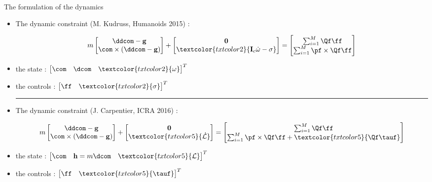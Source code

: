 \begin{frame}{The formulation of the dynamics}

\begin{itemize}

\item The dynamic constraint \textcolor{txtcolor2}{(M. Kudruss, Humanoids 2015)} :
\begin{scriptsize}
\begin{align*}
  m
  \begin{bmatrix}
  \ddcom - {\bf g} \\
  \com \times (\ddcom - {\bf g})
  \end{bmatrix}
  +
  \begin{bmatrix}
   {\bf 0} \\
     \textcolor{txtcolor2}{{\bf I}_c \dot{\omega} - \sigma}
  \end{bmatrix}
  =
  \begin{bmatrix}
  \sum_{i=1}^{M}
  \Qf \ff \\
  \sum_{i=1}^{M}
  \pf \times \Qf  \ff
  \end{bmatrix}
\end{align*}
\end{scriptsize}
\item the state :
$
\begin{bmatrix}
\com & \dcom & \textcolor{txtcolor2}{\omega}
\end{bmatrix}^T
$
\item the controls :
$
\begin{bmatrix}
\ff & \textcolor{txtcolor2}{\sigma}
\end{bmatrix}^T
$

\textcolor{txtcolor1}{\hrule}
\vspace*{0.5cm}

\item The dynamic constraint \textcolor{txtcolor5}{(J. Carpentier, ICRA 2016)} :
\begin{scriptsize}
\begin{align*}
  m
  \begin{bmatrix}
  \ddcom - {\bf g} \\
  \com \times (\ddcom - {\bf g})
  \end{bmatrix}
  +
  \begin{bmatrix}
   {\bf 0} \\
   \textcolor{txtcolor5}{ \dot{\mathcal{L}} }
  \end{bmatrix}
  =
  \begin{bmatrix}
  \sum_{i=1}^{M}
  \Qf \ff \\
  \sum_{i=1}^{M}
  \pf \times \Qf  \ff +
  \textcolor{txtcolor5}{ \Qf \tauf}
  \end{bmatrix}
\end{align*}
\end{scriptsize}
\item the state :
$
\begin{bmatrix}
\com & {\bf h}=m\dcom & \textcolor{txtcolor5}{\mathcal{L}}
\end{bmatrix}^T
$
\item the controls :
$
\begin{bmatrix}
\ff & \textcolor{txtcolor5}{\tauf}
\end{bmatrix}^T
$


\end{itemize}
\end{frame}
